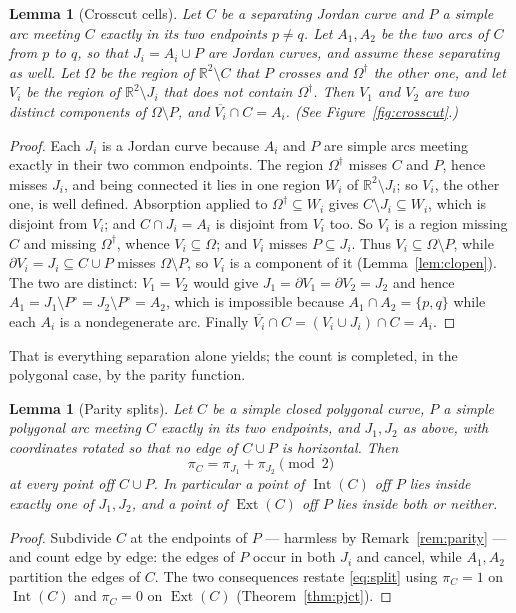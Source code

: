 \documentclass[11pt,a4paper]{article}
\theoremstyle{jsplain}
\newtheorem{lemma}[theorem]{Lemma}
\theoremstyle{jsdefn}
\newcommand{\Int}{\operatorname{Int}}
\newcommand{\Ext}{\operatorname{Ext}}
\begin{document}
\begin{lemma}[Crosscut cells]\label{lem:cells}
Let $C$ be a separating Jordan curve and $P$ a simple arc meeting $C$
exactly in its two endpoints $p\ne q$. Let $A_1,A_2$ be the two arcs
of $C$ from $p$ to $q$, so that $J_i=A_i\cup P$ are Jordan curves, and
assume these separating as well. Let $\Omega$ be the region of
$\mathbb R^2\setminus C$ that $P$ crosses and $\Omega^\dagger$ the
other one, and let $V_i$ be the region of $\mathbb R^2\setminus J_i$
that does \emph{not} contain $\Omega^\dagger$. Then $V_1$ and $V_2$
are two distinct components of $\Omega\setminus P$, and
$\overline{V_i}\cap C=A_i$. \textup(See Figure~\ref{fig:crosscut}.\textup)
\end{lemma}
\begin{proof}
Each $J_i$ is a Jordan curve because $A_i$ and $P$ are simple arcs
meeting exactly in their two common endpoints. The region
$\Omega^\dagger$ misses $C$ and $P$, hence misses $J_i$, and being
connected it lies in one region $W_i$ of $\mathbb R^2\setminus J_i$; so
$V_i$, the other one, is well defined. Absorption applied to
$\Omega^\dagger\subseteq W_i$ gives $C\setminus J_i\subseteq W_i$,
which is disjoint from $V_i$; and $C\cap J_i=A_i$ is disjoint from
$V_i$ too. So $V_i$ is a region missing $C$ and missing
$\Omega^\dagger$, whence $V_i\subseteq\Omega$; and $V_i$ misses
$P\subseteq J_i$. Thus $V_i\subseteq\Omega\setminus P$, while
$\partial V_i=J_i\subseteq C\cup P$ misses $\Omega\setminus P$, so
$V_i$ is a component of it (Lemma~\ref{lem:clopen}). The two are
distinct: $V_1=V_2$ would give $J_1=\partial V_1=\partial V_2=J_2$ and
hence $A_1=J_1\setminus P^\circ=J_2\setminus P^\circ=A_2$, which is
impossible because $A_1\cap A_2=\{p,q\}$ while each $A_i$ is a
nondegenerate arc. Finally
$\overline{V_i}\cap C=(V_i\cup J_i)\cap C=A_i$.
\end{proof}

That is everything separation alone yields; the count is completed, in
the polygonal case, by the parity function.

\begin{lemma}[Parity splits]\label{lem:split}
Let $C$ be a simple closed polygonal curve, $P$ a simple polygonal arc
meeting $C$ exactly in its two endpoints, and $J_1,J_2$ as above, with
coordinates rotated so that no edge of $C\cup P$ is horizontal. Then
\begin{equation}\label{eq:split}
\pi_C=\pi_{J_1}+\pi_{J_2}\pmod 2
\end{equation}
at every point off $C\cup P$. In particular a point of $\Int(C)$ off
$P$ lies inside exactly one of $J_1,J_2$, and a point of $\Ext(C)$ off
$P$ lies inside both or neither.
\end{lemma}
\begin{proof}
Subdivide $C$ at the endpoints of $P$ --- harmless by
Remark~\ref{rem:parity} --- and count edge by edge: the
edges of $P$ occur in both $J_i$ and cancel, while $A_1,A_2$ partition
the edges of $C$. The two consequences restate \eqref{eq:split} using
$\pi_C=1$ on $\Int(C)$ and $\pi_C=0$ on $\Ext(C)$
(Theorem~\ref{thm:pjct}).
\end{proof}
\end{document}
